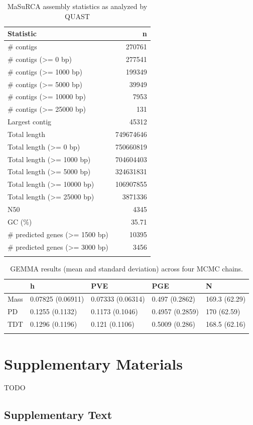 \documentclass[smallextended]{svjour3}
\newcommand{\beginsupplement}{%
        \setcounter{table}{0}
        \renewcommand{\thetable}{S\arabic{table}}
        \setcounter{figure}{0}
        \renewcommand{\thefigure}{S\arabic{figure}}
        \renewcommand{\thesection}{S\arabic{section}}
        \renewcommand{\thesubsection}{S\arabic{subsection}}
     }
\begin{document}
\begin{longtable}[]{@{}lr@{}}
\caption{MaSuRCA assembly statistics as analyzed by QUAST}\\
\toprule
Statistic & n\tabularnewline
\midrule
\endhead
\# contigs & \num{270761}\tabularnewline
\# contigs (\textgreater{}= 0 bp) & \num{277541}\tabularnewline
\# contigs (\textgreater{}= 1000 bp) & \num{199349}\tabularnewline
\# contigs (\textgreater{}= 5000 bp) & \num{39949}\tabularnewline
\# contigs (\textgreater{}= \num{10000} bp) & \num{7953}\tabularnewline
\# contigs (\textgreater{}= \num{25000} bp) & \num{131}\tabularnewline
Largest contig & \num{45312}\tabularnewline
Total length & \num{749674646}\tabularnewline
Total length (\textgreater{}= 0 bp) & \num{750660819}\tabularnewline
Total length (\textgreater{}= 1000 bp) & \num{704604403}\tabularnewline
Total length (\textgreater{}= 5000 bp) & \num{324631831}\tabularnewline
Total length (\textgreater{}= \num{10000} bp) & \num{106907855}\tabularnewline
Total length (\textgreater{}= \num{25000} bp) & \num{3871336}\tabularnewline
N50 & 4345\tabularnewline
GC (\%) & 35.71\tabularnewline
\# predicted genes (\textgreater{}= 1500 bp) & \num{10395}\tabularnewline
\# predicted genes (\textgreater{}= 3000 bp) & 3456\tabularnewline
\bottomrule
\label{tab:masurca}
\end{longtable}


\clearpage

\begin{longtable}[]{@{}lllll@{}}
\caption{GEMMA results (mean and standard deviation) across four MCMC chains.}\\
\toprule
& h & PVE & PGE & N\tabularnewline
\midrule
\endhead
Mass & 0.07825 (0.06911) & 0.07333 (0.06314) & 0.497 (0.2862) & 169.3
(62.29)\tabularnewline
PD & 0.1255 (0.1132) & 0.1173 (0.1046) & 0.4957 (0.2859) & 170
(62.59)\tabularnewline
TDT & 0.1296 (0.1196) & 0.121 (0.1106) & 0.5009 (0.286) & 168.5
(62.16)\tabularnewline
\bottomrule
\label{tab:gemma}
\end{longtable}

\clearpage


\beginsupplement%

\section*{Supplementary Materials}
TODO

\subsection*{Supplementary Text}\label{ss:supp}
\end{document}
